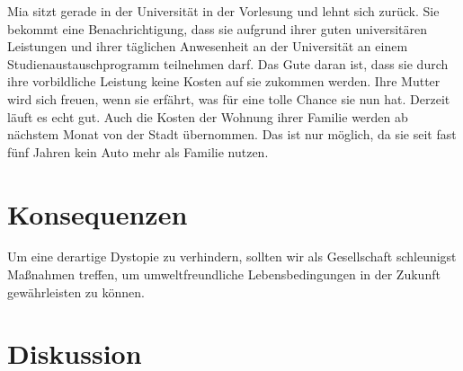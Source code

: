 \documentclass[twoside, a4paper, DIV=11, open=any, bibliography=totoc]{scrbook}
\begin{document}
Mia sitzt gerade in der Universität in der Vorlesung und lehnt sich zurück. 
Sie bekommt eine Benachrichtigung, dass sie aufgrund ihrer guten universitären 
Leistungen und ihrer täglichen Anwesenheit an der Universität an einem 
Studienaustauschprogramm teilnehmen darf. Das Gute daran ist, 
dass sie durch ihre vorbildliche Leistung keine Kosten auf sie zukommen werden. 
Ihre Mutter wird sich freuen, wenn sie erfährt, was für eine tolle Chance sie nun hat. 
Derzeit läuft es echt gut. Auch die Kosten der Wohnung ihrer Familie werden 
ab nächstem Monat von der Stadt übernommen. Das ist nur möglich, da sie seit fast 
fünf Jahren kein Auto mehr als Familie nutzen.

\section{Konsequenzen} \label{sec:szenkonsequenzen}

Um eine derartige Dystopie zu verhindern, sollten wir als Gesellschaft 
schleunigst Maßnahmen treffen,
um umweltfreundliche Lebensbedingungen in der Zukunft gewährleisten zu können.

\section{Diskussion}
\end{document}
